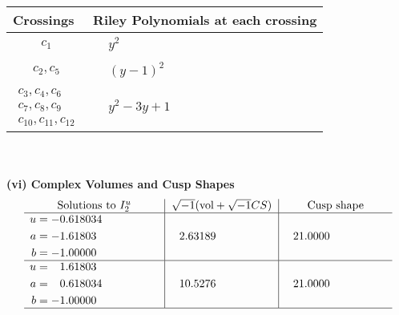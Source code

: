 \documentclass[1p]{elsarticle_modified}
\theoremstyle{definition}
\newcommand{\I}{\sqrt{-1}}
\begin{document}
\begin{tabular}{m{50pt}|m{274pt}}
Crossings & \hspace{64pt}Riley Polynomials at each crossing \\
\hline $$\begin{aligned}c_{1}\end{aligned}$$&$\begin{aligned}
&y^2
\end{aligned}$\\
\hline $$\begin{aligned}c_{2},c_{5}\end{aligned}$$&$\begin{aligned}
&(y-1)^2
\end{aligned}$\\
\hline $$\begin{aligned}c_{3},c_{4},c_{6}\\c_{7},c_{8},c_{9}\\c_{10},c_{11},c_{12}\end{aligned}$$&$\begin{aligned}
&y^2-3 y+1
\end{aligned}$\\
\hline
\end{tabular}\\~\\
\newpage\flushleft \textbf{(vi) Complex Volumes and Cusp Shapes}
$$\begin{array}{c|c|c}  
\text{Solutions to }I^u_{2}& \I (\text{vol} + \sqrt{-1}CS) & \text{Cusp shape}\\
 \hline 
\begin{aligned}
u &= -0.618034\phantom{ +0.000000I} \\
a &= -1.61803\phantom{ +0.000000I} \\
b &= -1.00000\phantom{ +0.000000I}\end{aligned}
 & \phantom{-}2.63189\phantom{ +0.000000I} & \phantom{-}21.0000\phantom{ +0.000000I} \\ \hline\begin{aligned}
u &= \phantom{-}1.61803\phantom{ +0.000000I} \\
a &= \phantom{-}0.618034\phantom{ +0.000000I} \\
b &= -1.00000\phantom{ +0.000000I}\end{aligned}
 & \phantom{-}10.5276\phantom{ +0.000000I} & \phantom{-}21.0000\phantom{ +0.000000I}\\
 \hline 
 \end{array}$$\newpage
\newpage\renewcommand{\arraystretch}{1}
\end{document}
